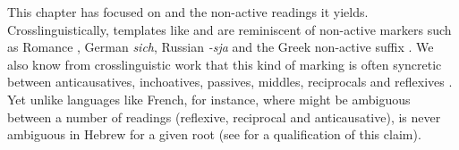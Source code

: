 {This chapter has focused on {\vz} and the non-active readings it yields. Crosslinguistically, templates like {\tnif} and {\thit} are reminiscent of non-active markers such as Romance , German \emph{sich}, Russian \emph{-sja} and the Greek non-active suffix . We also know from crosslinguistic work that this kind of marking is often syncretic between anticausatives, inchoatives, passives, middles, reciprocals and reflexives \citep{geniusiene87,klaiman91,alexiadoudoron12}. Yet unlike languages like French, for instance, where  might be ambiguous between a number of readings (reflexive, reciprocal and anticausative), {\thit} is never ambiguous in Hebrew for a given root (see \citealt{kastner17gjgl} for a qualification of this claim).

%
%	
%
}
